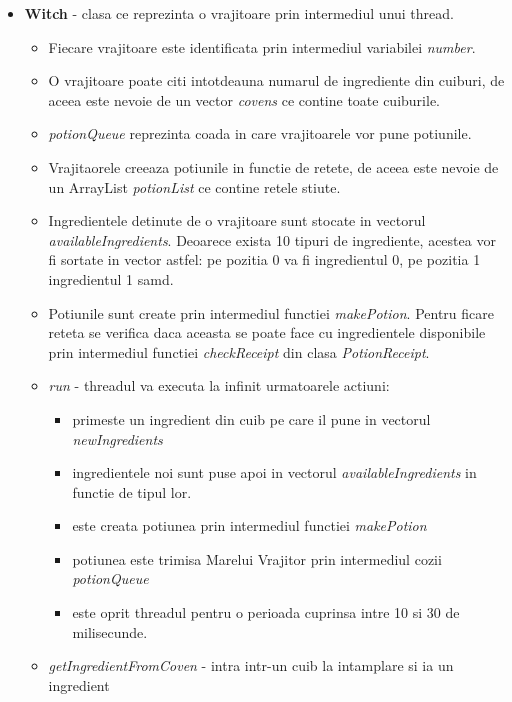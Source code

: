 \documentclass{article}
\begin{document}
\begin{itemize}
        \item \textbf{Witch} -  clasa ce reprezinta o vrajitoare prin intermediul unui thread.
            \begin{itemize}
                \item Fiecare vrajitoare este identificata prin intermediul variabilei \textit{number}.
                \item O vrajitoare poate citi intotdeauna numarul de ingrediente din cuiburi, de aceea este nevoie de un vector \textit{covens} ce contine toate cuiburile.
                \item \textit{potionQueue} reprezinta coada in care vrajitoarele vor pune potiunile.
                \item Vrajitaorele creeaza potiunile in functie de retete, de aceea este nevoie de un ArrayList \textit{potionList} ce contine retele stiute.
                \item Ingredientele detinute de o vrajitoare sunt stocate in vectorul \textit{availableIngredients}. Deoarece exista 10 tipuri de ingrediente, acestea vor fi sortate in vector astfel: pe pozitia 0 va fi ingredientul 0, pe pozitia 1 ingredientul 1 samd.
                \item Potiunile sunt create prin intermediul functiei \textit{makePotion}. Pentru ficare reteta se verifica daca aceasta se poate face cu ingredientele disponibile prin intermediul functiei \textit{checkReceipt} din clasa \textit{PotionReceipt}.
                \item \textit{run} -  threadul va executa la infinit urmatoarele actiuni:
                    \begin{itemize}
                        \item primeste un ingredient din cuib pe care il pune in vectorul \textit{newIngredients}
                        \item ingredientele noi sunt puse apoi in vectorul \textit{availableIngredients} in functie de tipul lor.
                        \item este creata potiunea prin intermediul functiei \textit{makePotion}
                        \item potiunea este trimisa Marelui Vrajitor prin intermediul cozii \textit{potionQueue}
                        \item este oprit threadul pentru o perioada cuprinsa intre 10 si 30 de milisecunde.
                    \end{itemize}
                \item \textit{getIngredientFromCoven} - intra intr-un cuib la intamplare si ia un ingredient
            \end{itemize}
            

\end{itemize}
\end{document}
